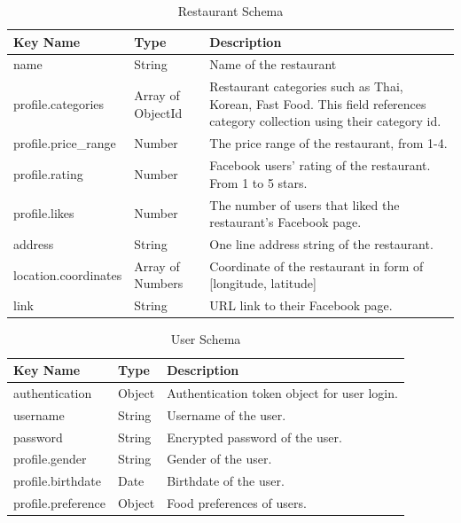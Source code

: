 \documentclass[12pt,oneside,openright,a4paper]{cpe-english-project}
\begin{document}
\begin{table}[H]
\caption{Restaurant Schema}\label{tbl:3RestaurantSchema}
\begin{tabularx}{\textwidth}{l|l|X} \hline\hline
Key Name & Type & Description \\ \hline\hline
name & String & Name of the restaurant \\ \hline
profile.categories & Array of ObjectId & Restaurant categories such as Thai, Korean, Fast Food. This field references category collection using their category id. \\ \hline
profile.price\_range & Number & The price range of the restaurant, from 1-4. \\ \hline
profile.rating & Number & Facebook users’ rating of the restaurant. From 1 to 5 stars. \\ \hline
profile.likes & Number & The number of users that liked the restaurant’s Facebook page. \\ \hline
address & String & One line address string of the restaurant. \\ \hline
location.coordinates & Array of Numbers & Coordinate of the restaurant in form of [longitude, latitude] \\ \hline
link & String & URL link to their Facebook page. \\ \hline\hline
\end{tabularx}
\end{table}

\begin{table}[H]
\caption{User Schema}\label{tbl:3UserSchema}
\begin{tabularx}{\textwidth}{l|l|X} \hline\hline
Key Name & Type & Description \\ \hline\hline
authentication & Object & Authentication token object for user login. \\ \hline
username & String & Username of the user. \\ \hline
password & String & Encrypted password of the user. \\ \hline
profile.gender & String & Gender of the user. \\ \hline
profile.birthdate & Date & Birthdate of the user. \\ \hline
profile.preference & Object & Food preferences of users. \\ \hline\hline
\end{tabularx}
\end{table}
\end{document}
